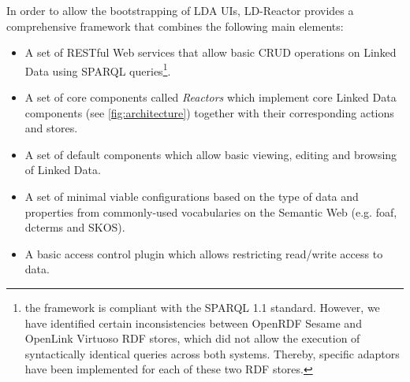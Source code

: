 \documentclass{acm_proc_article-sp}
\begin{document}
In order to allow the bootstrapping of LDA UIs, LD-Reactor provides a comprehensive framework that combines the following main elements:
\begin{itemize}

\item A set of RESTful Web services that allow basic CRUD operations on Linked Data using SPARQL queries\footnote{the framework is compliant with the SPARQL 1.1 standard. However, we have identified certain inconsistencies between OpenRDF Sesame and OpenLink Virtuoso RDF stores, which did not allow the execution of syntactically identical queries across both systems. Thereby, specific adaptors have been implemented for each of these two RDF stores.}.

\item A set of core components called \emph{Reactors} which implement core Linked Data components (see \autoref{fig:architecture}) together with their corresponding actions and stores.

\item A set of default components which allow basic viewing, editing and browsing of Linked Data.

\item A set of minimal viable configurations based on the type of data and properties from commonly-used vocabularies on the Semantic Web (e.g. foaf, dcterms and SKOS).

\item A basic access control plugin which allows restricting read/write access to data.

\end{itemize}

%
\end{document}
